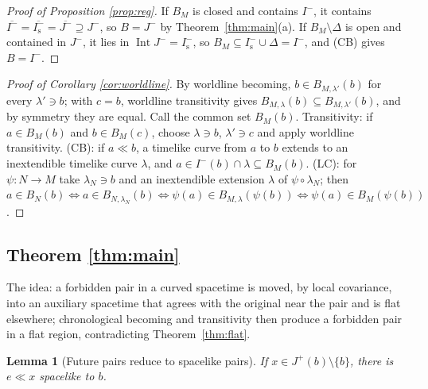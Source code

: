 \documentclass[11pt]{article}
\newtheorem{lemma}[theorem]{Lemma}
\theoremstyle{definition}
\newcommand{\Ichr}{I^{-}}
\newcommand{\Jp}{J^{+}}
\newcommand{\Jm}{J^{-}}
\begin{document}
\begin{proof}[Proof of Proposition \ref{prop:reg}]
If $B_M$ is closed and contains $\Ichr$, it contains
$\overline{\Ichr}=\overline{\Ichr_{\mathrm s}}=\overline{\Jm}\supseteq\Jm$, so
$B=\Jm$ by Theorem~\ref{thm:main}(a). If $B_M\setminus\Delta$ is open and
contained in $\Jm$, it lies in $\operatorname{Int}\Jm=\Ichr_{\mathrm s}$, so
$B_M\subseteq\Ichr_{\mathrm s}\cup\Delta=\Ichr$, and (CB) gives $B=\Ichr$.
\end{proof}

\begin{proof}[Proof of Corollary \ref{cor:worldline}]
By worldline becoming, $b\in B_{M,\lambda'}(b)$ for every $\lambda'\ni b$; with
$c=b$, worldline transitivity gives $B_{M,\lambda}(b)\subseteq B_{M,\lambda'}(b)$,
and by symmetry they are equal. Call the common set $B_M(b)$. Transitivity: if
$a\in B_M(b)$ and $b\in B_M(c)$, choose $\lambda\ni b$, $\lambda'\ni c$ and apply
worldline transitivity. (CB): if $a\ll b$, a timelike curve from $a$ to $b$
extends to an inextendible timelike curve $\lambda$, and $a\in\Ichr(b)\cap\lambda
\subseteq B_M(b)$. (LC): for $\psi:N\to M$ take $\lambda_N\ni b$ and an
inextendible extension $\lambda$ of $\psi\circ\lambda_N$; then $a\in B_N(b)\iff
a\in B_{N,\lambda_N}(b)\iff\psi(a)\in B_{M,\lambda}(\psi(b))\iff\psi(a)\in
B_M(\psi(b))$.
\end{proof}

\subsection{Theorem \ref{thm:main}}

The idea: a forbidden pair in a curved spacetime is moved, by local
covariance, into an auxiliary spacetime that agrees with the original near
the pair and is flat elsewhere; chronological becoming and transitivity then
produce a forbidden pair in a flat region, contradicting
Theorem~\ref{thm:flat}.

\begin{lemma}[Future pairs reduce to spacelike pairs]\label{lem:R}
If $x\in\Jp(b)\setminus\{b\}$, there is $e\ll x$ spacelike to $b$.
\end{lemma}
\end{document}
